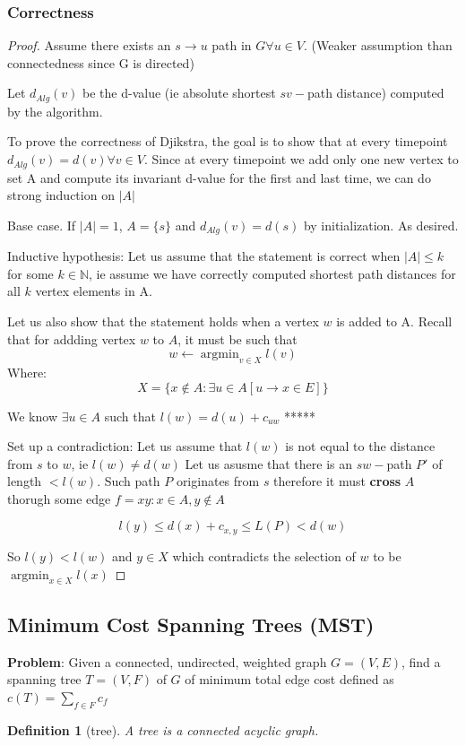 \documentclass{article}
\newtheorem{definition}{Definition}
\DeclareMathOperator*{\argmin}{argmin} %
\begin{document}
\subsubsection{Correctness}
\begin{proof}

Assume there exists an $s \rightarrow u$ path in $G \forall u \in V$. (Weaker assumption than connectedness since G is directed)

Let $d_{Alg}(v)$ be the d-value (ie absolute shortest $sv-$path distance) computed by the algorithm.

To prove the correctness of Djikstra, the goal is to show that at every timepoint $d_{Alg}(v) = d(v) \forall v \in V$. Since at every timepoint we add only one new vertex to set A and compute its invariant d-value for the first and last time, we can do strong induction on $|A|$

Base case. If $|A|=1$, $A = \{s\}$ and $d_{Alg}(v)= d(s)$ by initialization. As desired. 

Inductive hypothesis: Let us assume that the statement is correct when $|A| \leq k$ for some $k \in \mathbb{N}$, ie assume we have correctly computed shortest path distances for all $k$ vertex elements in A.

Let us also show that the statement holds when a vertex $w$ is added to A. Recall that for addding vertex $w$ to $A$, it must be such that 
\[ w \gets \argmin_{v \in X} l(v) \]
Where:
\[  X = \{x \not \in A : \exists u \in A  [u \rightarrow x \in E] \} \]

We know $\exists u \in A$ such that $l(w) = d(u) + c_{uw}$ *****

Set up a contradiction:
Let us assume that $l(w)$ is not equal to the distance from $s$ to $w$, ie $l(w) \neq d(w)$
Let us asusme that there is an $sw-$path $P'$ of length $< l(w)$. Such path $P$ originates from $s$ therefore it must \textbf{cross} $A$ thorugh some edge $f=xy : x\in A, y\not\in A$

\[ l(y) \leq d(x) + c_{x,y} \leq L(P) < d(w) \]

So $l(y) < l(w)$ and $y\in X$ which contradicts the selection of $w$ to be $\argmin_{x\in X}l(x)$

\end{proof}

\subsection{Minimum Cost Spanning Trees (MST)}
\textbf{Problem}: Given a connected, undirected, weighted graph $G=(V,E)$, find a spanning tree $T=(V,F)$ of $G$ of minimum total edge cost defined as $c(T) = \sum_{f\in F}c_{f}$
\begin{definition}[tree]
A tree is a connected acyclic graph.
\end{definition}
\end{document}
